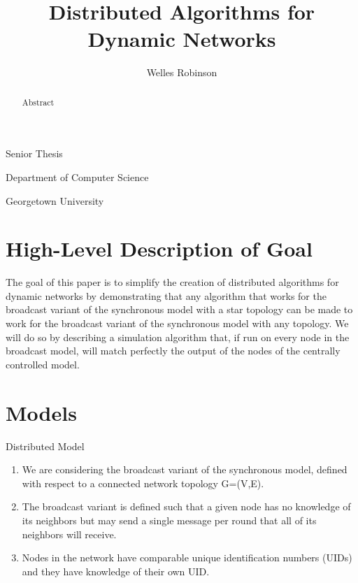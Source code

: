 \documentclass[english]{article}
\begin{document}
\title{Distributed Algorithms for Dynamic Networks}

\maketitle
\begin{center}\author{Welles Robinson}\end{center}
\noindent \begin{center}Senior Thesis\par\end{center}
\noindent \begin{center}Department of Computer
Science\par\end{center}
\noindent \begin{center}Georgetown University\par\end{center}

\newtheorem{definition} {Definition}
\newcommand{\mydef}[1]{\begin{definition}#1\end{definition}}

\begin{abstract}
Abstract
\end{abstract}

\section{High-Level Description of Goal}
The goal of this paper is to simplify the creation of distributed algorithms for dynamic networks by demonstrating that any algorithm that works for the broadcast variant of the synchronous model with a star topology can be made to work for the broadcast variant of the synchronous model with any topology. 
We will do so by describing a simulation algorithm that, if run on every node in the broadcast model, will match perfectly the output of the nodes of the centrally controlled model.

\section{Models}

Distributed Model
\begin{enumerate}
\item We are considering the broadcast variant of the synchronous model, defined with respect to a connected network topology G=(V,E).
\item The broadcast variant is defined such that a given node has no knowledge of its neighbors but may send a single message per round that all of its neighbors will receive.
\item Nodes in the network have comparable unique identification numbers (UIDs) and they have knowledge of their own UID. 
\end{enumerate}
\end{document}
